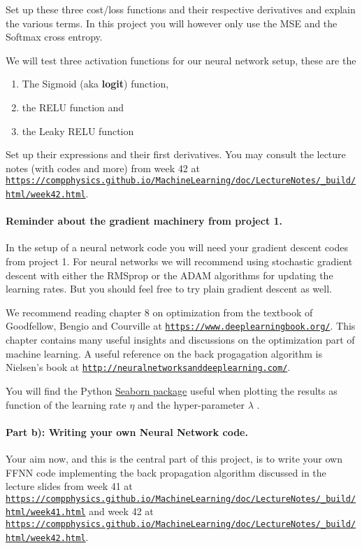 \documentclass[%
oneside,                 %
final,                   %
10pt]{article}
\begin{document}
\noindent
Set up these three cost/loss functions and their respective derivatives and explain the various terms. In this project you will however only use the MSE and the Softmax  cross entropy.

We will test three activation functions for our neural network setup, these are the 
\begin{enumerate}
\item The Sigmoid (aka \textbf{logit}) function,

\item the RELU function and

\item the Leaky RELU function
\end{enumerate}

\noindent
Set up their expressions and their first derivatives.
You may consult the lecture notes (with codes and more) from week 42 at \href{{https://compphysics.github.io/MachineLearning/doc/LectureNotes/_build/html/week42.html}}{\nolinkurl{https://compphysics.github.io/MachineLearning/doc/LectureNotes/_build/html/week42.html}}.

\paragraph{Reminder about the gradient machinery from project 1.}
In the setup of a neural network code you will need your gradient descent codes from
project 1.  For neural networks we will recommend using stochastic
gradient descent with either the RMSprop or the ADAM algorithms for
updating the learning rates. But you should feel free to try plain gradient descent as well.

We recommend reading chapter 8 on optimization from the textbook of
Goodfellow, Bengio and Courville at
\href{{https://www.deeplearningbook.org/}}{\nolinkurl{https://www.deeplearningbook.org/}}. This chapter contains many
useful insights and discussions on the optimization part of machine
learning.  A useful reference on the back progagation algorithm is
Nielsen's book at \href{{http://neuralnetworksanddeeplearning.com/}}{\nolinkurl{http://neuralnetworksanddeeplearning.com/}}. 

You will find the Python \href{{https://seaborn.pydata.org/generated/seaborn.heatmap.html}}{Seaborn
package}
useful when plotting the results as function of the learning rate
$\eta$ and the hyper-parameter $\lambda$ .

\paragraph{Part b): Writing your own Neural Network code.}
Your aim now, and this is the central part of this project, is to
write your own FFNN code implementing the back
propagation algorithm discussed in the lecture slides from week 41 at \href{{https://compphysics.github.io/MachineLearning/doc/LectureNotes/_build/html/week41.html}}{\nolinkurl{https://compphysics.github.io/MachineLearning/doc/LectureNotes/_build/html/week41.html}} and week 42 at \href{{https://compphysics.github.io/MachineLearning/doc/LectureNotes/_build/html/week42.html}}{\nolinkurl{https://compphysics.github.io/MachineLearning/doc/LectureNotes/_build/html/week42.html}}.
\end{document}
